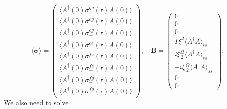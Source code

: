 \documentclass{article}
\begin{document}
\begin{equation}
	\langle \bm{\sigma} \rangle =
	\begin{pmatrix}
		\langle A^{\dagger}(0) \sigma^{gg}(\tau) A(0) \rangle \\
		\langle A^{\dagger}(0) \sigma^{eg}_{-}(\tau) A(0) \rangle \\
		\langle A^{\dagger}(0) \sigma^{eg}_{+}(\tau) A(0) \rangle \\
		\langle A^{\dagger}(0) \sigma^{ee}(\tau) A(0) \rangle \\
		\langle A^{\dagger}(0) \sigma^{fe}_{-}(\tau) A(0) \rangle \\
		\langle A^{\dagger}(0) \sigma^{fe}_{+}(\tau) A(0) \rangle \\
		\langle A^{\dagger}(0) \sigma^{fg}_{-}(\tau) A(0) \rangle \\
		\langle A^{\dagger}(0) \sigma^{fg}_{+}(\tau) A(0) \rangle
	\end{pmatrix}, \quad \bm{B} =
	\begin{pmatrix}
		0 \\
		0 \\
		0 \\
		\Gamma \xi^{2} \langle A^{\dagger} A \rangle_{ss} \\
		i \xi \frac{\Omega}{2} \langle A^{\dagger} A \rangle_{ss} \\
		-i \xi \frac{\Omega}{2} \langle A^{\dagger} A \rangle_{ss} \\
		0 \\
		0
	\end{pmatrix}.
\end{equation}
We also need to solve
\end{document}
